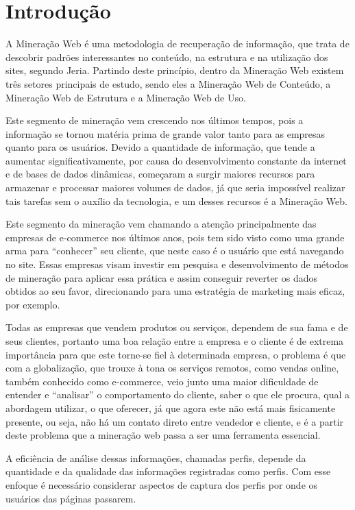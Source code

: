 \chapter{Introdução}

    A Mineração Web é uma metodologia de recuperação de informação, que trata de descobrir padrões interessantes no conteúdo, na estrutura e na utilização dos sites, segundo Jeria\cite{Escobar}. Partindo deste princípio, dentro da Mineração Web existem três setores principais de estudo, sendo eles a Mineração Web de Conteúdo, a Mineração Web de Estrutura e a Mineração Web de Uso.

    Este segmento de mineração vem crescendo nos últimos tempos, pois a informação se tornou matéria prima de grande valor tanto para as empresas quanto para os usuários. Devido a quantidade de informação, que tende a aumentar significativamente, por causa do desenvolvimento constante da internet e de bases de dados dinâmicas, começaram a surgir maiores recursos para armazenar e processar maiores volumes de dados, já que seria impossível realizar tais tarefas sem o auxílio da tecnologia, e um desses recursos é a Mineração Web.

	Este segmento da mineração vem chamando a atenção principalmente das empresas de e-commerce nos últimos anos, pois tem sido visto como uma grande arma para “conhecer” seu cliente, que neste caso é o usuário que está navegando no site. Essas empresas visam investir em pesquisa e desenvolvimento de métodos de mineração para aplicar essa prática e assim conseguir reverter os dados obtidos ao seu favor, direcionando para uma estratégia de marketing mais eficaz, por exemplo.

	Todas as empresas que vendem produtos ou serviços, dependem de sua fama e de seus clientes, portanto uma boa relação entre a empresa e o cliente é de extrema importância para que este torne-se fiel à determinada empresa, o problema é que com a globalização, que trouxe à tona os serviços remotos, como vendas online, também conhecido como e-commerce, veio junto uma maior dificuldade de entender e “analisar” o comportamento do cliente, saber o que ele procura, qual a abordagem utilizar, o que oferecer, já que agora este não está mais fisicamente presente, ou seja, não há um contato direto entre vendedor e cliente, e é a partir deste problema que a mineração web passa a ser uma ferramenta essencial.

	A eficiência de análise dessas informações, chamadas perfis, depende da quantidade e da qualidade das informações registradas como perfis. Com esse enfoque é necessário considerar aspectos de captura dos perfis por onde os usuários das páginas passarem.


